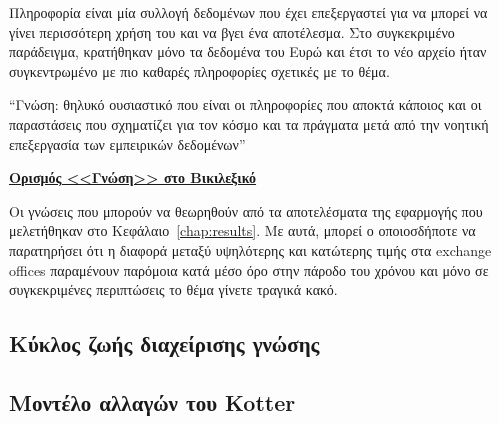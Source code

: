 Πληροφορία είναι μία συλλογή δεδομένων που έχει επεξεργαστεί για να μπορεί να γίνει περισσότερη χρήση του και να βγει ένα αποτέλεσμα. Στο συγκεκριμένο παράδειγμα, κρατήθηκαν μόνο τα δεδομένα του Ευρώ και έτσι το νέο αρχείο ήταν συγκεντρωμένο με πιο καθαρές πληροφορίες σχετικές με το θέμα.

\begin{problem}
  ``Γνώση: θηλυκό ουσιαστικό που είναι οι πληροφορίες που αποκτά κάποιος και οι παραστάσεις που σχηματίζει για τον κόσμο και τα πράγματα μετά από την νοητική επεξεργασία των εμπειρικών δεδομένων''

  \href{https://el.wiktionary.org/wiki/%CE%B3%CE%BD%CF%8E%CF%83%CE%B7}{\textbf{Ορισμός <<Γνώση>> στο Βικιλεξικό}}
\end{problem}

Οι γνώσεις που μπορούν να θεωρηθούν από τα αποτελέσματα της εφαρμογής που μελετήθηκαν στο Κεφάλαιο~\ref{chap:results}. Με αυτά, μπορεί ο οποιοσδήποτε να παρατηρήσει ότι η διαφορά μεταξύ υψηλότερης και κατώτερης τιμής στα exchange offices παραμένουν παρόμοια κατά μέσο όρο στην πάροδο του χρόνου και μόνο σε συγκεκριμένες περιπτώσεις το θέμα γίνετε τραγικά κακό.

\subsection{Κύκλος ζωής διαχείρισης γνώσης}

\subsection{Μοντέλο αλλαγών του Kotter}
